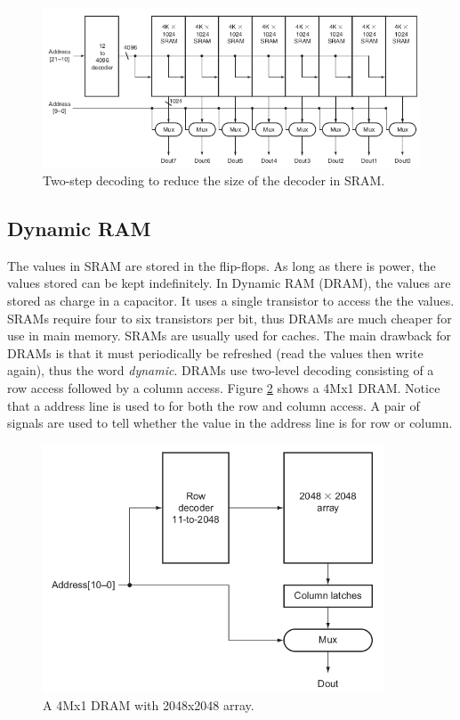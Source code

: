 \documentclass[a4paper, 11pt,oneside]{article}
\begin{document}
\begin{figure}[H]
	\begin{center}
	\includegraphics[width=5in]{sram2.png}
	\caption{Two-step decoding to reduce the size of the decoder in SRAM.}
	\label{fig:sram2} 
	\end{center}
\end{figure}

\subsection{Dynamic RAM}
The values in SRAM are stored in the flip-flops. As long as there is power, the
values stored can be kept indefinitely. In Dynamic RAM (DRAM), the values are 
stored as charge in a capacitor. It uses a single transistor to access the
the values. SRAMs require four to six transistors per bit, thus DRAMs are much 
cheaper for use in main memory. SRAMs are usually used for caches. The main 
drawback for DRAMs is that it must periodically be refreshed (read the 
values then write again), thus the word \textit{dynamic}. DRAMs use two-level 
decoding consisting of a row access followed by a column access.  
Figure \ref{fig:dram0} shows a 4Mx1 DRAM. Notice that a address line is used to 
for both the row and column access. A pair of signals are used to tell whether 
the value in the address line is for row or column.



\begin{figure}[H]
	\begin{center}
	\includegraphics[width=4in]{dram0.png}
	\caption{A 4Mx1 DRAM with 2048x2048 array.}
	\label{fig:dram0} 
	\end{center}
\end{figure}
\end{document}

